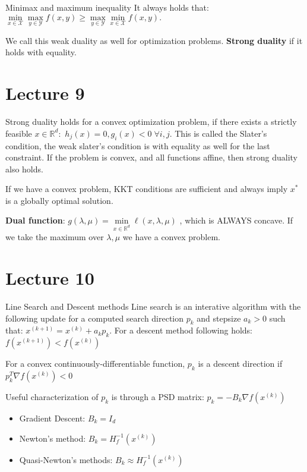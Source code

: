 \documentclass[a4paper]{article}
\begin{document}
\begin{subbox}{Minimax and maximum inequality}
    It always holds that:
    $\underset{x\in \mathcal{X}}{\min} \underset{y\in \mathcal{Y}}{\max} f(x,y) \geq \underset{y\in \mathcal{Y}}{\max} \underset{x\in \mathcal{X}}{\min}f(x,y) 
    .$
\end{subbox}
We call this weak duality as well for optimization problems. \textbf{Strong duality} if it holds with equality.

\section{Lecture 9}
Strong duality holds for a convex optimization problem, if there exists a strictly feasible $x\in \mathbb{R}^d: $ $h_j(x) = 0, g_i(x) < 0 \; \forall i,j$. This is called the Slater's condition, the weak slater's condition is with equality as well for the last constraint. If the problem is convex, and all functions affine, then strong duality also holds.

\begin{subbox}{}
    If we have a convex problem, KKT conditions are sufficient and always imply $x^*$ is a globally optimal solution. 
\end{subbox}

\textbf{Dual function}:  $g(\lambda, \mu) = \underset{x\in \mathbb{R}^d}{\min}\ell(x,\lambda,\mu)$ , which is ALWAYS concave. If we take the maximum over $\lambda,\mu$ we have a convex problem. 
\section{Lecture 10}
\begin{mainbox}{Line Search and Descent methods}
    Line search is an interative algorithm with the following update for a computed search direction $p_k$ and stepsize $a_k > 0$ such that:
    $x^{(k+1)} = x^{(k)} + a_k p_k$. For a descent method following holds: $f(x^{(k+1)}) < f(x^{(k)}) $    
\end{mainbox}
For a convex continuously-differentiable function, $p_k$ is a descent direction if $p_k^T\nabla f(x^{(k)}) < 0$  

Useful characterization of $p_k$ is through a PSD matrix: $p_k = -B_k \nabla f(x^{(k)})$

\begin{itemize}
    \item Gradient Descent: $B_k = I_d$
    \item Newton's method: $B_k = H_f^{-1}(x^{(k)})$ 
    \item Quasi-Newton's methods: $B_k \approx H_f^{-1}(x^{(k)})$
\end{itemize}
\end{document}
